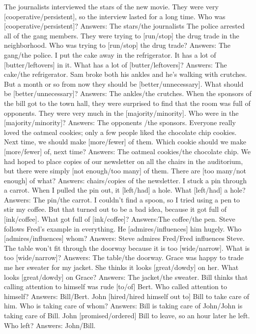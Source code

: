 \begin{foo}
The journalists interviewed the stars of the new movie. They were very [cooperative/persistent], so the interview lasted for a long time. Who was [cooperative/persistent]? Answers: The stars/the journalists
The police arrested all of the gang members. They were trying to [run/stop] the drug trade in the neighborhood. Who was trying to [run/stop] the drug trade? Answers: The gang/the police.
I put the cake away in the refrigerator. It has a lot of [butter/leftovers] in it. What has a lot of [butter/leftovers]? Answers: The cake/the refrigerator.
Sam broke both his ankles and he's walking with crutches. But a month or so from now they should be [better/unnecessary]. What should be [better/unnecessary]? Answers: The ankles/the crutches.
When the sponsors of the bill got to the town hall, they were surprised to find that the room was full of opponents. They were very much in the [majority/minority]. Who were in the [majority/minority]? Answers: The opponents /the sponsors.
Everyone really loved the oatmeal cookies; only a few people liked the chocolate chip cookies. Next time, we should make [more/fewer] of them. Which cookie should we make [more/fewer] of, next time? Answers: The oatmeal cookies/the chocolate  chip.
We had hoped to place copies of our newsletter on all the chairs in the auditorium, but there were simply [not enough/too many] of them. There are [too many/not enough] of what? Answers: chairs/copies of the newsletter.
I stuck a pin through a carrot. When I pulled the pin out, it [left/had] a hole. What [left/had] a hole? Answers: The pin/the carrot. 
I couldn't find a spoon, so I tried using a pen to stir my coffee. But that turned out to be a bad idea, because it got full of [ink/coffee]. What got full of [ink/coffee]? Answers:The coffee/the pen.
Steve follows Fred's example in everything. He [admires/influences] him hugely. Who [admires/influences] whom? Answers: Steve admires Fred/Fred influences  Steve.
The table won't fit through the doorway because it is too [wide/narrow]. What is too [wide/narrow]? Answers: The table/the doorway.
Grace was happy to trade me her sweater for my jacket. She thinks it looks [great/dowdy] on her. What looks [great/dowdy] on Grace? Answers: The jacket/the sweater.
Bill thinks that calling attention to himself was rude [to/of] Bert. Who called attention to himself? Answers: Bill/Bert.
John [hired/hired himself out to] Bill to take care of him. Who is taking care of whom? Answers: Bill is taking care of John/John is taking care of  Bill.
John [promised/ordered] Bill to leave, so an hour later he left. Who left? Answers: John/Bill.

\end{foo}
